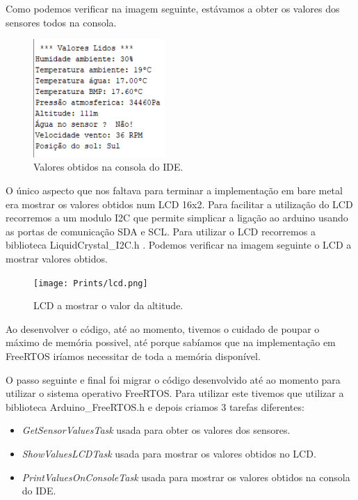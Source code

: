 \documentclass[11pt]{report}
\begin{document}
Como podemos verificar na imagem seguinte, estávamos a obter os valores dos sensores todos na consola.


\begin{figure} [!h]
\centering
\includegraphics[width=50mm]{Prints/valores_consola.png}
\caption{Valores obtidos na consola do IDE.}
\label{Rotulo}
\end{figure}

O único aspecto que nos faltava para terminar a implementação em bare metal era mostrar os valores obtidos num LCD 16x2. Para facilitar a utilização do LCD recorremos a um modulo I2C que permite simplicar a ligação ao arduino usando as portas de comunicação SDA e SCL. Para utilizar o LCD recorremos a biblioteca LiquidCrystal\_I2C.h \cite{lcdbiblio}.  Podemos verificar na imagem seguinte o LCD a mostrar valores obtidos.


\begin{figure} [!h]
\centering
\texttt{[image: Prints/lcd.png]}
\caption{LCD a mostrar o valor da altitude.}
\label{Rotulo}
\end{figure}

Ao desenvolver o código, até ao momento, tivemos o cuidado de poupar o máximo de memória possivel, até porque sabíamos que na implementação em FreeRTOS iríamos necessitar de toda a memória disponível. \cite{memoria}

O passo seguinte e final foi migrar o código desenvolvido até ao momento para utilizar o sistema operativo FreeRTOS. Para utilizar este tivemos que utilizar a biblioteca Arduino\_FreeRTOS.h \cite{rtos} e depois criamos 3 tarefas diferentes:

\begin{itemize}

\item \textit{GetSensorValuesTask} usada para obter os valores dos sensores.

\item \textit{ShowValuesLCDTask} usada para mostrar os valores obtidos no LCD.

\item \textit{PrintValuesOnConsoleTask} usada para mostrar os valores obtidos na consola do IDE.

\end{itemize}
\end{document}
